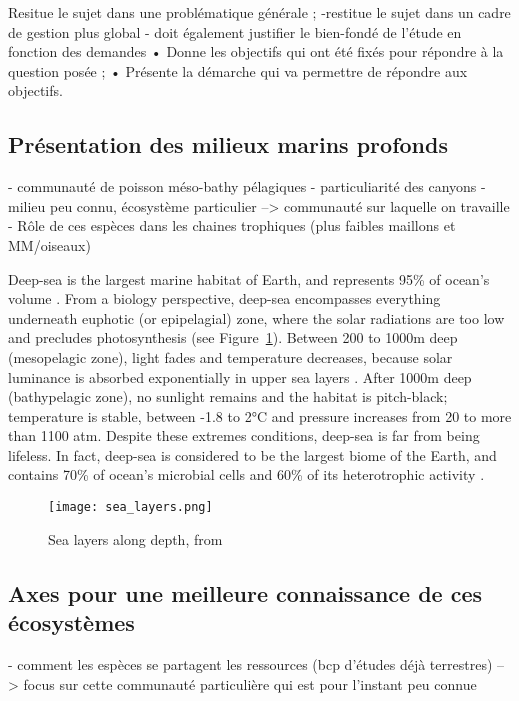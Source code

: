 

Resitue le sujet dans une problématique générale ;
 -restitue le sujet dans un cadre de gestion plus global
- doit également justifier le bien-fondé de l’étude en fonction des demandes
• Donne les objectifs qui ont été fixés pour répondre à la question posée ;
• Présente la démarche qui va permettre de répondre aux objectifs.


\subsection{Présentation des milieux marins profonds}
- communauté de poisson méso-bathy pélagiques 
- particuliarité des canyons 
- milieu peu connu, écosystème particulier --> communauté sur laquelle on travaille 
- Rôle de ces espèces dans les chaines trophiques (plus faibles maillons et MM/oiseaux)

Deep-sea is the largest marine habitat of Earth, and represents 95\% of ocean's volume \citep{danovaro2017,salazar2016}. From a biology perspective, deep-sea encompasses everything underneath euphotic (or epipelagial) zone, where the solar radiations are too low and precludes photosynthesis \citep{danovaro2017,salazar2016} (see Figure~\ref{fig:dsl}). Between 200 to 1000m deep (mesopelagic zone), light fades and temperature decreases, because solar luminance is absorbed exponentially in upper sea layers \citep{reynolds2001}. After 1000m deep (bathypelagic zone), no sunlight remains and the habitat is pitch-black; temperature is stable, between -1.8 to 2°C and pressure increases from 20 to more than 1100 atm. 
Despite these extremes conditions, deep-sea is far from being lifeless. In fact, deep-sea is considered to be the largest biome of the Earth, and contains 70\% of ocean's microbial cells and 60\% of its heterotrophic activity \citep{salazar2016}. 

\begin{figure} [!htbp]
	\begin{center}
		\texttt{[image: sea\_layers.png]}
	\end{center}
	\caption[Petite légende]{Sea layers along depth, from \citep{fig_deep_sea}}
	\label{fig:dsl}
\end{figure}



\subsection{Axes pour une meilleure connaissance de ces écosystèmes}
- comment les espèces se partagent les ressources (bcp d'études déjà terrestres)
         --> focus sur cette communauté particulière qui est pour l'instant peu connue

